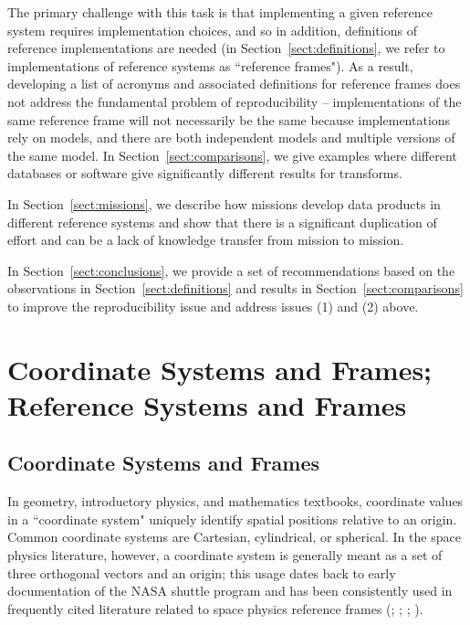 \documentclass[draft]{agujournal2019}
\begin{document}
The primary challenge with this task is that implementing a given reference system requires implementation choices, and so in addition, definitions of reference implementations are needed (in Section~\ref{sect:definitions}, we refer to implementations of reference systems as ``reference frames"). As a result, developing a list of acronyms and associated definitions for reference frames does not address the fundamental problem of reproducibility -- implementations of the same reference frame will not necessarily be the same because implementations rely on models, and there are both independent models and multiple versions of the same model. In Section~\ref{sect:comparisons}, we give examples where different databases or software give significantly different results for transforms. 

In Section~\ref{sect:missions}, we describe how missions develop data products in different reference systems and show that there is a significant duplication of effort and can be a lack of knowledge transfer from mission to mission.

In Section~\ref{sect:conclusions}, we provide a set of recommendations based on the observations in Section~\ref{sect:definitions} and results in Section~\ref{sect:comparisons} to improve the reproducibility issue and address issues (1) and (2) above.

\section{Coordinate Systems and Frames; Reference Systems and Frames}
\label{sect:terminology}

\subsection{Coordinate Systems and Frames}

In geometry, introductory physics, and mathematics textbooks, coordinate values in a ``coordinate system" uniquely identify spatial positions relative to an origin. Common coordinate systems are Cartesian, cylindrical, or spherical. In the space physics literature, however, a coordinate system is generally meant as a set of three orthogonal vectors and an origin; this usage dates back to early documentation of the NASA shuttle program \cite{NASA1965} and has been consistently used in frequently cited literature related to space physics reference frames (; ; ; ).
\end{document}
